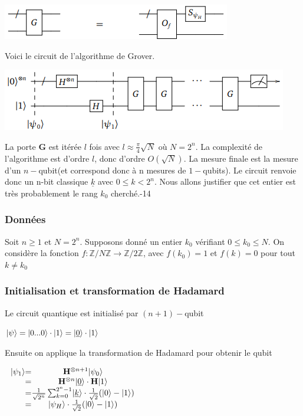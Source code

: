 \documentclass[12pt,openany]{report}
\DeclarePairedDelimiter\ket{\lvert}{\rangle}
\begin{document}
\begin{center}
\includegraphics[scale=1.3]{./circuit_f}
\end{center}
Voici le circuit de l'algorithme de Grover.
\begin{center}
\includegraphics[scale=1.3]{./circuit_final}
\end{center}

La porte \textbf{G} est itérée $l$ fois avec $l \approx \frac{\pi}{4}\sqrt{N} $ où $\mathit{N}=2^n $. La complexité de l'algorithme est d'ordre $l$, donc d'ordre $\mathit{O}(\sqrt{N}) $. La mesure finale est la mesure d'un $n-$qubit(et correspond donc à n mesures de $1-$qubits). Le circuit renvoie donc un n-bit classique $\underline{k} $ avec $ 0\leq k < 2^n $. Nous allons justifier que cet entier est très probablement le rang $k_0 $ cherché.\cite{Arnaud}-14
\subsubsection{Données}

Soit $n \geq 1 $ et $ \mathit{N}=2^n $. Supposons donné un entier $k_0 $ vérifiant $0\leq k_0 \leq \mathit{N} $. On considère la fonction $ f:\mathbb{Z}/N\mathbb{Z}\longrightarrow \mathbb{Z}/2\mathbb{Z} $, avec $f(k_0)=1 $ et $f(k)=0 $ pour tout $ k \neq k_0 $
\subsubsection{Initialisation et transformation de Hadamard}

Le circuit quantique est initialisé par $(n+1)-$qubit \cite{Arnaud}
\begin{center}
$ \ket{\psi}=\ket{0...0}\cdot \ket{1}=\ket{\underline{0}}\cdot \ket{1} $
\end{center}
Ensuite on applique la transformation de Hadamard pour obtenir le qubit

$ 
  \left.
\begin{array}{ c @{=}  c }

\ket{\psi_1} & \mathbf{H}^{\otimes n +1} \ket{\psi_0}\\
& \mathbf{H}^{\otimes n}\ket{\underline{0}}\cdot \mathbf{H}\ket{1}\\
& \frac{1}{\sqrt{2^n}}\sum_{k=0}^{2^n-1}\ket{\underline{k}}\cdot \frac{1}{\sqrt{2}}(\ket{0}-\ket{1})\\
& \ket{\psi_H}\cdot \frac{1}{\sqrt{2}}(\ket{0}-\ket{1})\\

\end{array}
\right.
$
\end{document}
